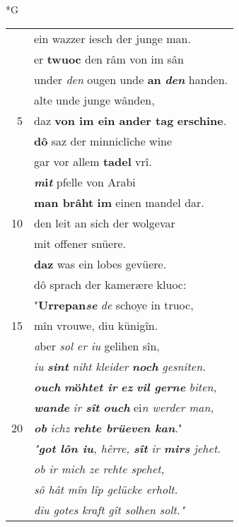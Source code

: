 \documentclass[8pt,a4paper,notitlepage]{article}
\begin{document}
\newpage
\begin{table}[ht]
\begin{minipage}[t]{0.5\linewidth}
\small
\begin{center}*G
\end{center}
\begin{tabular}{rl}
 & ein wazzer iesch der junge man.\\ 
 & er \textbf{twuoc} den râm von im sân\\ 
 & under \textit{den} ougen unde \textbf{an} \textit{\textbf{den}} handen.\\ 
 & alte unde junge wânden,\\ 
5 & daz \textbf{von im ein ander tag} \textbf{erschine}.\\ 
 & \textbf{dô} saz der minniclîche wine\\ 
 & gar vor allem \textbf{tadel} vrî.\\ 
 & \textbf{\textit{m}i\textit{t}} pfelle von Arabi\\ 
 & \textbf{man brâht} \textbf{im} einen mandel dar.\\ 
10 & den leit an sich der wolgevar\\ 
 & mit offener snüere.\\ 
 & \textbf{daz} was ein lobes gevüere.\\ 
 & dô sprach der kamerære kluoc:\\ 
 & "\textbf{Urrepan\textit{se}} \textit{de} schoye in truoc,\\ 
15 & mîn vrouwe, diu künigîn.\\ 
 & \textit{a}ber \textit{sol er iu} gelihen sîn,\\ 
 & \textit{iu} \textbf{\textit{sint}} \textit{niht kleider} \textit{\textbf{noch} gesniten.}\\ 
 & \textit{\textbf{ouch}} \textbf{\textit{m}ö\textit{htet ir}} \textit{\textbf{ez}} \textit{\textbf{vil gerne}} \textit{biten,}\\ 
 & \textit{\textbf{wande}} \textit{ir \textbf{sît} \textbf{ouch}} ei\textit{n werder man,}\\ 
20 & \textbf{\textit{ob}} \textit{ichz} \textit{\textbf{rehte brüeven kan}}."\\ 
 & \textit{"\textbf{got lôn iu}, hêrre, \textbf{sît} ir \textbf{mir}\textbf{s} jehet.}\\ 
 & \textit{ob ir mich ze rehte spehet,}\\ 
 & \textit{sô hât mîn lîp gelücke erholt.}\\ 
 & \textit{diu gotes kraft gît solhen solt."}\\ 

\end{tabular}
\end{minipage}
\end{table}
\end{document}
